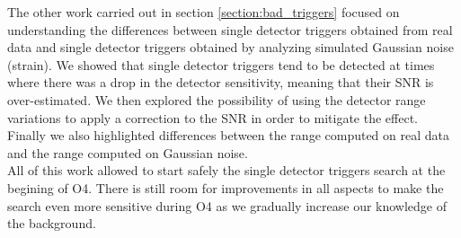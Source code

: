 The other work carried out in section \ref{section:bad_triggers} focused on understanding the differences between single detector triggers obtained from real data and single detector triggers obtained by analyzing simulated Gaussian noise (strain).
We showed that single detector triggers tend to be detected at times where there was a drop in the detector sensitivity, meaning that their SNR is over-estimated.
We then explored the possibility of using the detector range variations to apply a correction to the SNR in order to mitigate the effect.
Finally we also highlighted differences between the range computed on real data and the range computed on Gaussian noise.\\

All of this work allowed to start safely the single detector triggers search at the begining of O4.
There is still room for improvements in all aspects to make the search even more sensitive during O4 as we gradually increase our knowledge of the background.